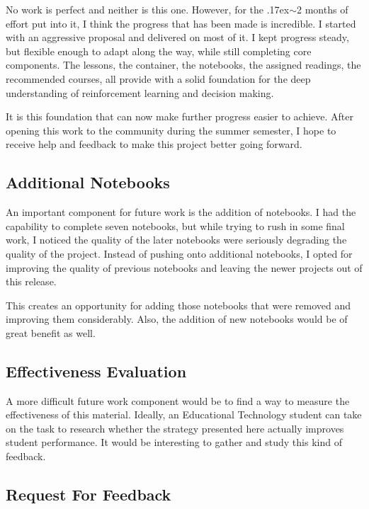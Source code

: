 \documentclass[11pt]{article} %
\begin{document}
No work is perfect and neither is this one. However, for the
{\raise.17ex\hbox{$\scriptstyle\sim$}}2 months of effort
put into it, I think the progress that has been made is incredible. I started
with an aggressive proposal and delivered on most of it. I kept progress steady, but
flexible enough to adapt along the way, while still completing core components.
The lessons, the container, the notebooks, the assigned readings, the recommended
courses, all provide with a solid foundation for the deep understanding of
reinforcement learning and decision making.

It is this foundation that can now make further progress easier to achieve. After
opening this work to the community during the summer semester, I hope to receive
help and feedback to make this project better going forward.

\subsection{Additional Notebooks}

An important component for future work is the addition of notebooks. I had the capability
to complete seven notebooks, but while trying to rush in some final work, I noticed
the quality of the later notebooks were seriously degrading the quality of the
project. Instead of pushing onto additional notebooks, I opted for improving the quality of previous notebooks and
leaving the newer projects out of this release.

This creates an opportunity for adding those notebooks that were removed and
improving them considerably. Also, the addition of new notebooks would be of
great benefit as well.

\subsection{Effectiveness Evaluation}

A more difficult future work component would be to find a way to measure the effectiveness
of this material. Ideally, an Educational Technology student can take on the task
to research whether the strategy presented here actually improves student
performance. It would be interesting to gather and study this kind of feedback.

\subsection{Request For Feedback}
\end{document}
